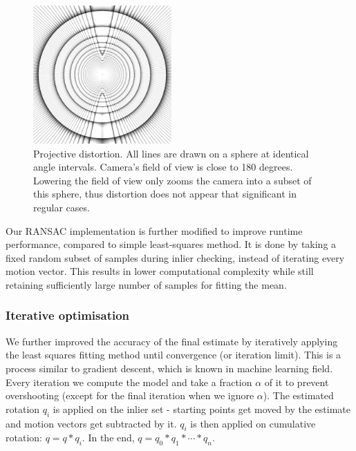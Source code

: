 \documentclass[11pt,english]{report}
\begin{document}
\begin{figure}[!ht]
	\centering
	\includegraphics[width=150pt]{docs/report/distortion.jpg}
	\caption{\centering Projective distortion. All lines are drawn on a sphere at identical angle intervals. Camera's field of view is close to 180 degrees. Lowering the field of view only zooms the camera into a subset of this sphere, thus distortion does not appear that significant in regular cases.}
\end{figure}

Our RANSAC implementation is further modified to improve runtime performance, compared to simple least-squares method. It is done by taking a fixed random subset of samples during inlier checking, instead of iterating every motion vector. This results in lower computational complexity while still retaining sufficiently large number of samples for fitting the mean.

\subsubsection{Iterative optimisation}

We further improved the accuracy of the final estimate by iteratively applying the least squares fitting method until convergence (or iteration limit). This is a process similar to gradient descent, which is known in machine learning field. Every iteration we compute the model and take a fraction $\alpha$ of it to prevent overshooting (except for the final iteration when we ignore $\alpha$). The estimated rotation $q_i$ is applied on the inlier set - starting points get moved by the estimate and motion vectors get subtracted by it. $q_i$ is then applied on cumulative rotation: $q = q * q_i$. In the end, $q = q_0 * q_1 * \cdots * q_n$.
\end{document}
